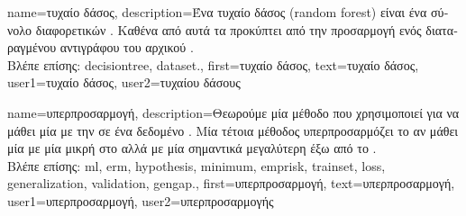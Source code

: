{name={\foreignlanguage{greek}{τυχαίο δάσος}},
	description={\foreignlanguage{greek}{Ένα τυχαίο δάσος} (random forest) 
		\foreignlanguage{greek}{είναι ένα σύνολο διαφορετικών} . 
		\foreignlanguage{greek}{Καθένα από αυτά τα}  \foreignlanguage{greek}{προκύπτει από την προσαρμογή 
		ενός διαταραγμένου αντιγράφου του αρχικού} .\\
		\foreignlanguage{greek}{Βλέπε επίσης:} \gls{decisiontree}, \gls{dataset}.},
	first={\foreignlanguage{greek}{τυχαίο δάσος}}, 
	text={\foreignlanguage{greek}{τυχαίο δάσος}},
	user1={\foreignlanguage{greek}{τυχαίο δάσος}}, %
	user2={\foreignlanguage{greek}{τυχαίου δάσους}} %
}

{name={\foreignlanguage{greek}{υπερπροσαρμογή}},
	description={\foreignlanguage{greek}{Θεωρούμε μία μέθοδο}  
		 \foreignlanguage{greek}{που χρησιμοποιεί}  \foreignlanguage{greek}{για να μάθει μία}  
		\foreignlanguage{greek}{με την}   \foreignlanguage{greek}{σε ένα δεδομένο}  
		. \foreignlanguage{greek}{Μία τέτοια μέθοδος υπερπροσαρμόζει το}  \foreignlanguage{greek}{αν 
		μάθει μία}  \foreignlanguage{greek}{με μία μικρή}  \foreignlanguage{greek}{στο} 
		 \foreignlanguage{greek}{αλλά με μία σημαντικά μεγαλύτερη}  \foreignlanguage{greek}{έξω 
		από το} .\\
		\foreignlanguage{greek}{Βλέπε επίσης:} \gls{ml}, \gls{erm}, \gls{hypothesis}, \gls{minimum}, \gls{emprisk}, \gls{trainset}, \gls{loss}, 
		\gls{generalization}, \gls{validation}, \gls{gengap}.},
	first={\foreignlanguage{greek}{υπερπροσαρμογή}},
	text={\foreignlanguage{greek}{υπερπροσαρμογή}},
	user1={\foreignlanguage{greek}{υπερπροσαρμογή}}, %
    	user2={\foreignlanguage{greek}{υπερπροσαρμογής}} %
}

